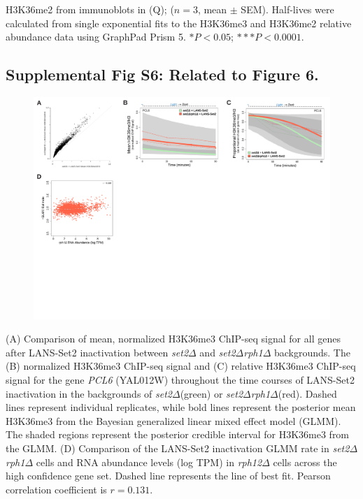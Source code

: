 \documentclass[11pt]{biorxiv}
\newcommand{\setdelt}{\emph{set2$\Delta$}\xspace}
\newcommand{\rphdelt}{\emph{rph12$\Delta$}\xspace}
\newcommand{\setdeltrphdelt}{\emph{set2$\Delta$rph1$\Delta$}\xspace}
\begin{document}
H3K36me2 from immunoblots in (Q); ($n = 3$, mean $\pm$ SEM). Half-lives were calculated from single exponential fits to the H3K36me3 and H3K36me2 relative abundance data using GraphPad Prism 5. $*P < 0.05$; $***P < 0.0001$. 

\clearpage

\subsection{Supplemental Fig S6: Related to Figure 6.}
\begin{figure}[ht!]
\center
\includegraphics[width=\textwidth, trim={0in 0in 0in 0in}, clip]{figures/Supplemental_Fig_S6_compressed.pdf}
\end{figure}
\vspace*{-1.5in}
\noindent (A) Comparison of mean, normalized H3K36me3 ChIP-seq signal for all genes after LANS-Set2 inactivation between \setdelt and \setdeltrphdelt backgrounds. The (B) normalized H3K36me3 ChIP-seq signal and (C) relative H3K36me3 ChIP-seq signal for the gene \emph{PCL6} (YAL012W) throughout the time courses of LANS-Set2 inactivation in the backgrounds of \setdelt (green) or \setdeltrphdelt (red). Dashed lines represent individual replicates, while bold lines represent the posterior mean H3K36me3 from the Bayesian generalized linear mixed effect model (GLMM). The shaded regions represent the posterior credible interval for H3K36me3 from the GLMM. (D) Comparison of the LANS-Set2 inactivation GLMM rate in \setdeltrphdelt cells and RNA abundance levels (log TPM) in \rphdelt cells across the high confidence gene set. Dashed line represents the line of best fit. Pearson correlation coefficient is $r=0.131$. 
\end{document}
